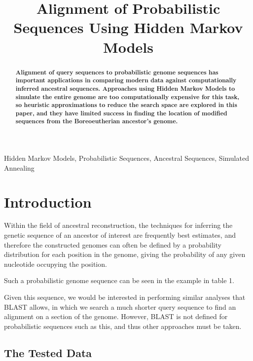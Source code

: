 \documentclass[12pt, conference]{IEEEtran}
\begin{document}
 

\title{Alignment of Probabilistic Sequences Using Hidden Markov Models}

\author{
}

\maketitle

\begin{abstract}
\textbf{Alignment of query sequences to probabilistic genome sequences has important applications in comparing modern data against computationally inferred ancestral sequences. Approaches using Hidden Markov Models to simulate the entire genome are too computationally expensive for this task, so heuristic approximations to reduce the search space are explored in this paper, and they have limited success in finding the location of modified sequences from the Boreoeutherian ancestor's genome.}
\end{abstract}

\begin{IEEEkeywords}
Hidden Markov Models, Probabilistic Sequences, Ancestral Sequences, Simulated Annealing
\end{IEEEkeywords}

\section{\textbf{Introduction}}

Within the field of ancestral reconstruction, the techniques for inferring the genetic sequence of an ancestor of interest are frequently best estimates, and therefore the constructed genomes can often be defined by a probability distribution for each position in the genome, giving the probability of any given nucleotide occupying the position.

Such a probabilistic genome sequence can be seen in the example in table 1.

Given this sequence, we would be interested in performing similar analyses that BLAST allows, in which we search a much shorter query sequence to find an alignment on a section of the genome. However, BLAST is not defined for probabilistic sequences such as this, and thus other approaches must be taken.


	\subsection{\textbf{The Tested Data}}
	
\end{document}
